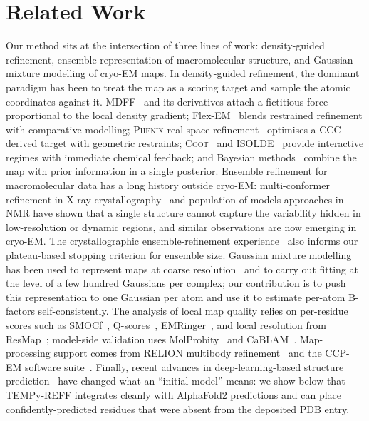 \section{Related Work}
Our method sits at the intersection of three lines of work: density-guided refinement, ensemble representation of macromolecular structure, and Gaussian mixture modelling of cryo-EM maps. In density-guided refinement, the dominant paradigm has been to treat the map as a scoring target and sample the atomic coordinates against it. MDFF~\cite{trabuco2008} and its derivatives attach a fictitious force proportional to the local density gradient; Flex-EM~\cite{topf2008,joseph2017} blends restrained refinement with comparative modelling; \textsc{Phenix} real-space refinement~\cite{afonine2018,liebschner2019} optimises a CCC-derived target with geometric restraints; \textsc{Coot}~\cite{emsley2010} and \textsc{ISOLDE}~\cite{croll2018} provide interactive regimes with immediate chemical feedback; and Bayesian methods~\cite{bonomi2018} combine the map with prior information in a single posterior. Ensemble refinement for macromolecular data has a long history outside cryo-EM: multi-conformer refinement in X-ray crystallography~\cite{levin2007,burnley2012} and population-of-models approaches in NMR have shown that a single structure cannot capture the variability hidden in low-resolution or dynamic regions, and similar observations are now emerging in cryo-EM. The crystallographic ensemble-refinement experience~\cite{burnley2012} also informs our plateau-based stopping criterion for ensemble size. Gaussian mixture modelling has been used to represent maps at coarse resolution~\cite{kawabata2008} and to carry out fitting at the level of a few hundred Gaussians per complex; our contribution is to push this representation to one Gaussian per atom and use it to estimate per-atom B-factors self-consistently. The analysis of local map quality relies on per-residue scores such as SMOCf~\cite{farabella2015,joseph2017}, Q-scores~\cite{pintilie2020}, EMRinger~\cite{barad2015}, and local resolution from ResMap~\cite{kucukelbir2014}; model-side validation uses MolProbity~\cite{williams2018,chen2010} and CaBLAM~\cite{williams2018}. Map-processing support comes from RELION multibody refinement~\cite{nakane2018,scheres2012} and the CCP-EM software suite~\cite{burnley2017,joseph2020}. Finally, recent advances in deep-learning-based structure prediction~\cite{jumper2021,baek2021} have changed what an ``initial model'' means: we show below that TEMPy-REFF integrates cleanly with AlphaFold2 predictions and can place confidently-predicted residues that were absent from the deposited PDB entry.
